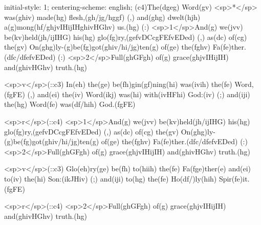 initial-style: 1;
centering-scheme: english;
(c4)The(dgeg) Word(gv) <sp>*</sp> was(ghiv) made(hg) flesh,(gh/jg/hggf) (,) and(ghg) dwelt(hjh) a(g)mong(hf/ghjvIHijIHghivHGhv) us.(hg) (:) <sp>1</sp>And(g) we(jvv) be(kv)held(jh/ijIHG) his(hg) glo(fg)ry,(gefvDCcgFEfvEDed) (,) as(dc) of(cg) the(gv) On(ghg)ly-(g)be(fg)got(ghiv/hi/jg)ten(g) of(ge) the(fghv) Fa(fe)ther.(dfc/dfefvEDed) (:) <sp>2</sp>Full(ghGFgh) of(g) grace(ghjvIHijIH) and(ghivHGhv) truth.(hg) 

<sp>v</sp>(::c3) In(eh) the(ge) be(fh)gin(gf)ning(hi) was(ivih) the(fe) Word,(fgFE) (,) and(ei) the(iv) Word(ikj) was(hi) with(ivHFhi) God:(iv) (;) and(iji) the(hg) Word(fe) was(df/hih) God.(fgFE) 

<sp>r</sp>(::c4) <sp>1</sp>And(g) we(jvv) be(kv)held(jh/ijIHG) his(hg) glo(fg)ry,(gefvDCcgFEfvEDed) (,) as(dc) of(cg) the(gv) On(ghg)ly-(g)be(fg)got(ghiv/hi/jg)ten(g) of(ge) the(fghv) Fa(fe)ther.(dfc/dfefvEDed) (:) <sp>2</sp>Full(ghGFgh) of(g) grace(ghjvIHijIH) and(ghivHGhv) truth.(hg) 

<sp>v</sp>(::c3) Glo(eh)ry(ge) be(fh) to(hiih) the(fe) Fa(fge)ther(e) and(ei) to(iv) the(hi) Son:(ikJHiv) (;) and(iji) to(hg) the(fe) Ho(df/)ly(hih) Spir(fe)it.(fgFE)

<sp>r</sp>(::c4) <sp>2</sp>Full(ghGFgh) of(g) grace(ghjvIHijIH) and(ghivHGhv) truth.(hg) 